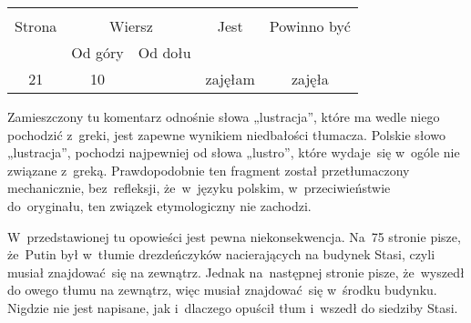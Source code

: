 \documentclass[a4paper,11pt]{article}
\begin{document}


\begin{center}

  \begin{tabular}{|c|c|c|c|c|}
    \hline
    & \multicolumn{2}{c|}{} & & \\
    Strona & \multicolumn{2}{c|}{Wiersz} & Jest
                              & Powinno być \\ \cline{2-3}
    & Od góry & Od dołu & & \\
    \hline
    21 & 10 & & zajęłam & zajęła \\
    \hline
  \end{tabular}

\end{center}

\vspace{\spaceTwo}











\vspace{0em}


\vspace{0em}


\start {} Zamieszczony tu komentarz odnośnie słowa
„lustracja”, które ma wedle niego pochodzić z~greki, jest zapewne
wynikiem niedbałości tłumacza. Polskie słowo „lustracja”, pochodzi
najpewniej od słowa „lustro”, które wydaje~się w~ogóle nie związane
z~greką. Prawdopodobnie ten fragment został przetłumaczony
mechanicznie, bez~refleksji, że~w~języku polskim, w~przeciwieństwie
do~oryginału, ten związek etymologiczny nie zachodzi.

\vspace{\spaceFour}



\start {} W~przedstawionej tu opowieści jest pewna
niekonsekwencja. Na~75 stronie pisze, że~Putin był w~tłumie
drezdeńczyków nacierających na budynek Stasi, czyli musiał
znajdować~się na zewnątrz. Jednak na~następnej stronie pisze,
że~wyszedł do owego tłumu na zewnątrz, więc musiał znajdować~się
w~środku budynku. Nigdzie nie jest napisane, jak i~dlaczego opuścił
tłum i~wszedł do siedziby Stasi.
\end{document}
